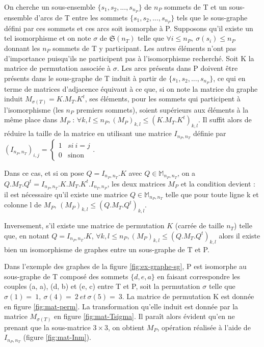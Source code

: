 \begin{pr}
On cherche un sous-ensemble $\{s_1, s_2, ..., s_{n_P}\}$ de $n_P$ sommets de T et un sous-ensemble d'arcs de T entre les sommets $\{s_1, s_2, ..., s_{n_P}\}$ tels que le sous-graphe défini par ces sommets et ces arcs soit isomorphe à P. Supposons qu'il existe un tel isomorphisme et on note $\sigma$ de $\mathfrak{S}(n_T)$ telle que $\forall i \leq n_P,\ \sigma(s_i) \leq n_P$ donnant les $n_P$ sommets de T y participant. Les autres éléments n'ont pas d'importance
puisqu'ils ne participent pas à l'isomorphisme recherché. Soit K la matrice de permutation associée à $\sigma$.
Les arcs présents dans P doivent être présents dans le sous-graphe de T induit à partir de $\{s_1, s_2, ..., s_{n_P}\}$, ce qui en terme de matrices d'adjacence équivaut à ce que, si on note la matrice du graphe induit $M_{\sigma(T)}=K.M_T.K^t$, ses éléments, pour les sommets qui participent à l'isomorphisme (les $n_P$ premiers sommets), soient supérieurs aux éléments à la même place dans $M_P$ : $\forall k,l\leq n_P, (M_P)_{k,l}\leq (K.M_T.K^t)_{k,l}$. Il suffit alors de réduire la taille de la matrice en utilisant une matrice $I_{n_P, n_T}$ définie par
$(I_{n_P, n_T})_{i, j} = \left\{
  \begin{array}{ll}
	  1 & si\ i=j
	\\0 & \mbox{sinon}
  \end{array}
\right.
$.


Dans ce cas, et si on pose $Q=I_{n_P, n_T}.K$ avec $Q\in \mathbb{M}_{n_P, n_T}$, on a $Q.M_T.Q^t=I_{n_P, n_T}.K.M_T.K^t.I_{n_T, n_P}$, les deux matrices $M_P$ et la condition devient : il est nécessaire qu'il existe une matrice $Q\in \mathbb{M}_{n_P, n_T}$ telle que pour toute ligne k et colonne l de $M_P$, $(M_P)_{k,l}\leq (Q.M_T.Q^t)_{k,l}$.

Inversement, s'il existe une matrice de permutation $K$ (carrée de taille $n_T$) telle que, en notant $Q=I_{n_P, n_T}.K$, $\forall k,l\leq n_P, (M_P)_{k,l}\leq (Q.M_T.Q^t)_{k,l}$ alors il existe bien un isomorphisme de graphes entre un sous-graphe de T et P.
\end{pr}

Dans l'exemple des graphes de la figure \ref{fig:ex-graphe-sg}, P est isomorphe au sous-graphe de T composé des sommets $\{d, e, a\}$ en faisant correspondre les couples (a, a), (d, b) et (e, c) entre T et P, soit la
permutation $\sigma$ telle que $\sigma(1)=~1,\ \sigma(4)=~2\ et\ \sigma(5)=~3$. La matrice de permutation K est donnée en figure \ref{fig:mat-perm}.
La transformation qu'elle induit est donnée par la matrice $M_{\sigma(T)}$ en figure \ref{fig:mat-Tsigma}. Il paraît alors évident qu'en ne prenant que la sous-matrice $3\times 3$, on obtient $M_P$, opération
réalisée à l'aide de $I_{n_P, n_T}$ (figure \ref{fig:mat-Inm}).



